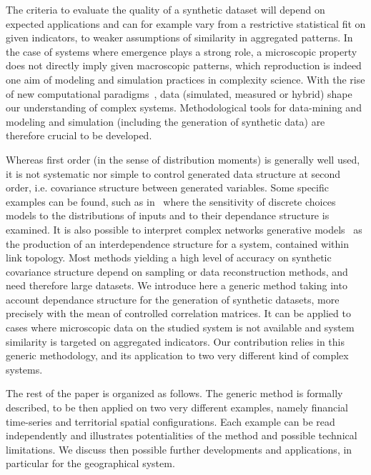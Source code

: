 \documentclass{article}
\begin{document}
The criteria to evaluate the quality of a synthetic dataset will depend on expected applications and can for example vary from a restrictive statistical fit on given indicators, to weaker assumptions of similarity in aggregated patterns. In the case of systems where emergence plays a strong role, a microscopic property does not directly imply given macroscopic patterns, which reproduction is indeed one aim of modeling and simulation practices in complexity science. With the rise of new computational paradigms~\cite{arthur2015complexity}, data (simulated, measured or hybrid) shape our understanding of complex systems. Methodological tools for data-mining and modeling and simulation (including the generation of synthetic data) are therefore crucial to be developed.



Whereas first order (in the sense of distribution moments) is generally well used, it is not systematic nor simple to control generated data structure at second order, i.e. covariance structure between generated variables. Some specific examples can be found, such as in~\cite{ye2011investigation} where the sensitivity of discrete choices models to the distributions of inputs and to their dependance structure is examined. It is also possible to interpret complex networks generative models~\cite{newman2003structure} as the production of an interdependence structure for a system, contained within link topology. Most methods yielding a high level of accuracy on synthetic covariance structure depend on sampling or data reconstruction methods, and need therefore large datasets. We introduce here a generic method taking into account dependance structure for the generation of synthetic datasets, more precisely with the mean of controlled correlation matrices. It can be applied to cases where microscopic data on the studied system is not available and system similarity is targeted on aggregated indicators. Our contribution relies in this generic methodology, and its application to two very different kind of complex systems.


The rest of the paper is organized as follows. The generic method is formally described, to be then applied on two very different examples, namely financial time-series and territorial spatial configurations. Each example can be read independently and illustrates potentialities of the method and possible technical limitations. We discuss then possible further developments and applications, in particular for the geographical system.
\end{document}
